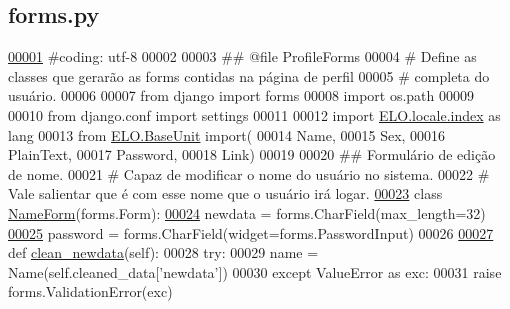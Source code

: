 \hypertarget{Profile_2forms_8py_source}{}\subsection{forms.\+py}
\label{Profile_2forms_8py_source}

\begin{DoxyCode}
\hypertarget{Profile_2forms_8py_source_l00001}{}\hyperlink{namespaceProfile_1_1forms}{00001} \textcolor{comment}{#coding: utf-8}
00002 
00003 \textcolor{comment}{## @file ProfileForms}
00004 \textcolor{comment}{#   Define as classes que gerarão as forms contidas na página de perfil}
00005 \textcolor{comment}{#   completa do usuário.}
00006 
00007 \textcolor{keyword}{from} django \textcolor{keyword}{import} forms
00008 \textcolor{keyword}{import} os.path
00009 
00010 \textcolor{keyword}{from} django.conf \textcolor{keyword}{import} settings
00011 
00012 \textcolor{keyword}{import} \hyperlink{namespaceELO_1_1locale_1_1index}{ELO.locale.index} \textcolor{keyword}{as} lang
00013 \textcolor{keyword}{from} \hyperlink{namespaceELO_1_1BaseUnit}{ELO.BaseUnit} import(
00014     Name,
00015     Sex,
00016     PlainText,
00017     Password,
00018     Link)
00019 
00020 \textcolor{comment}{## Formulário de edição de nome.}
00021 \textcolor{comment}{#   Capaz de modificar o nome do usuário no sistema.}
00022 \textcolor{comment}{#   Vale salientar que é com esse nome que o usuário irá logar.}
\hypertarget{Profile_2forms_8py_source_l00023}{}\hyperlink{classProfile_1_1forms_1_1NameForm}{00023} \textcolor{keyword}{class }\hyperlink{classProfile_1_1forms_1_1NameForm}{NameForm}(forms.Form):
\hypertarget{Profile_2forms_8py_source_l00024}{}\hyperlink{classProfile_1_1forms_1_1NameForm_a6ebfb316b263c162dd3895b1da149eda}{00024}     newdata     = forms.CharField(max\_length=32)
\hypertarget{Profile_2forms_8py_source_l00025}{}\hyperlink{classProfile_1_1forms_1_1NameForm_a5a6959db0132c607a56f9cda75769ecf}{00025}     password    = forms.CharField(widget=forms.PasswordInput)
00026 
\hypertarget{Profile_2forms_8py_source_l00027}{}\hyperlink{classProfile_1_1forms_1_1NameForm_a3feb3d340b4c8b18b55bcfa0a91758c1}{00027}     \textcolor{keyword}{def }\hyperlink{classProfile_1_1forms_1_1NameForm_a3feb3d340b4c8b18b55bcfa0a91758c1}{clean\_newdata}(self):
00028         \textcolor{keywordflow}{try}:
00029             name = Name(self.cleaned\_data[\textcolor{stringliteral}{'newdata'}])
00030         \textcolor{keywordflow}{except} ValueError \textcolor{keyword}{as} exc:
00031             \textcolor{keywordflow}{raise} forms.ValidationError(exc)

\end{DoxyCode}
